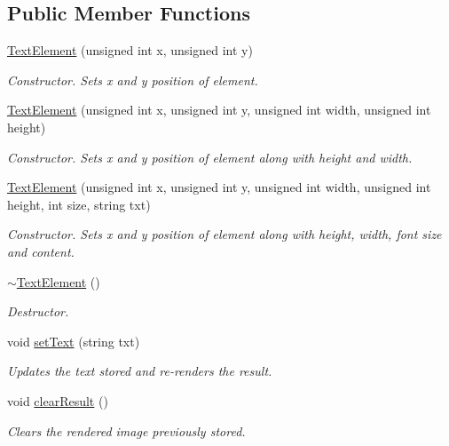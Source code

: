 \subsection*{Public Member Functions}
\begin{DoxyCompactItemize}
\item 
\hyperlink{class_text_element_aec15920e1f8e03bdd865ff3f6e0c396d}{Text\-Element} (unsigned int x, unsigned int y)
\begin{DoxyCompactList}\small\item\em Constructor. Sets x and y position of element. \end{DoxyCompactList}\item 
\hyperlink{class_text_element_ace1dec06df5c4a0635a4784b56a52b33}{Text\-Element} (unsigned int x, unsigned int y, unsigned int width, unsigned int height)
\begin{DoxyCompactList}\small\item\em Constructor. Sets x and y position of element along with height and width. \end{DoxyCompactList}\item 
\hyperlink{class_text_element_a288497cfc1863148bfc6ed9d8450f96b}{Text\-Element} (unsigned int x, unsigned int y, unsigned int width, unsigned int height, int size, string txt)
\begin{DoxyCompactList}\small\item\em Constructor. Sets x and y position of element along with height, width, font size and content. \end{DoxyCompactList}\item 
\hyperlink{class_text_element_a8638bd2628b9a0815bae74a8baf73c1f}{$\sim$\-Text\-Element} ()
\begin{DoxyCompactList}\small\item\em Destructor. \end{DoxyCompactList}\item 
void \hyperlink{class_text_element_a5f6f8013ecd934bd628ecaf6361bf03a}{set\-Text} (string txt)
\begin{DoxyCompactList}\small\item\em Updates the text stored and re-\/renders the result. \end{DoxyCompactList}\item 
void \hyperlink{class_text_element_a2d61f3953226d9d4d06d4003d6c33c34}{clear\-Result} ()
\begin{DoxyCompactList}\small\item\em Clears the rendered image previously stored. \end{DoxyCompactList}\end{DoxyCompactItemize}
